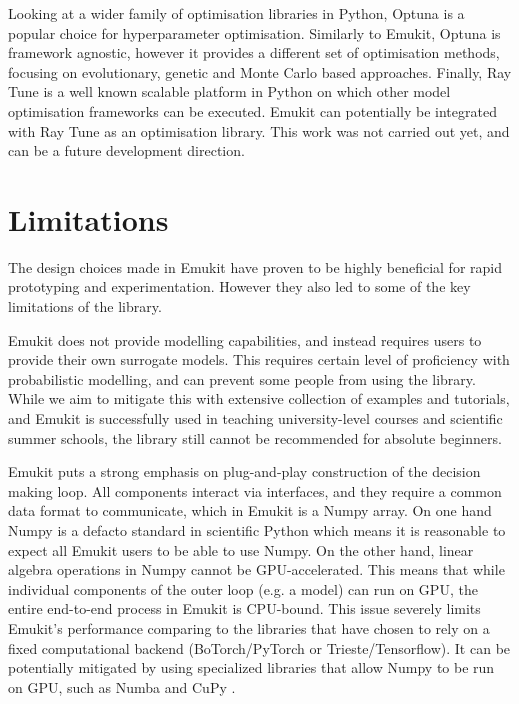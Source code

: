 Looking at a wider family of optimisation libraries in Python, Optuna \cite{optuna_2019} is a popular choice for hyperparameter optimisation. Similarly to Emukit, Optuna is framework agnostic, however it provides a different set of optimisation methods, focusing on evolutionary, genetic and Monte Carlo based approaches. Finally, Ray Tune \cite{liaw2018tune} is a well known scalable platform in Python on which other model optimisation frameworks can be executed. Emukit can potentially be integrated with Ray Tune as an optimisation library. This work was not carried out yet, and can be a future development direction.

\section{Limitations}\label{section:limitations}
The design choices made in Emukit have proven to be highly beneficial for rapid prototyping and experimentation. However they also led to some of the key limitations of the library.

Emukit does not provide modelling capabilities, and instead requires users to provide their own surrogate models. This requires certain level of proficiency with probabilistic modelling, and can prevent some people from using the library. While we aim to mitigate this with extensive collection of examples and tutorials, and Emukit is successfully used in teaching university-level courses and scientific summer schools, the library still cannot be recommended for absolute beginners.

Emukit puts a strong emphasis on plug-and-play construction of the decision making loop. All components interact via interfaces, and they require a common data format to communicate, which in Emukit is a Numpy array. On one hand Numpy is a defacto standard in scientific Python which means it is reasonable to expect all Emukit users to be able to use Numpy. On the other hand, linear algebra operations in Numpy cannot be GPU-accelerated. This means that while individual components of the outer loop  (e.g. a model) can run on GPU, the entire end-to-end process in Emukit is CPU-bound. This issue severely limits Emukit's performance comparing to the libraries that have chosen to rely on a fixed computational backend (BoTorch/PyTorch or Trieste/Tensorflow). It can be potentially mitigated by using specialized libraries that allow Numpy to be run on GPU, such as Numba \cite{lam2015numba} and CuPy \cite{nishino2017cupy}.

